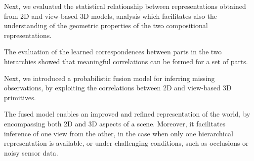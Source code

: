 \documentclass[runningheads]{llncs}
\begin{document}
Next, we evaluated the statistical relationship between representations obtained from 2D and view-based 3D models, analysis which facilitates also the understanding of the geometric properties of the two compositional representations.

The evaluation of the learned correspondences between parts in the two hierarchies showed that meaningful correlations can be formed for a set of parts. 

Next, we introduced a probabilistic fusion model for inferring missing observations, by exploiting the correlations between 2D and view-based 3D primitives.
 
The fused model enables an improved and refined representation of the world, by encompassing both 2D and 3D aspects of a scene. Moreover, it facilitates inference of one view from the other, in the case when only one hierarchical representation is available, or under challenging conditions, such as occlusions or noisy sensor data. 



\end{document}
